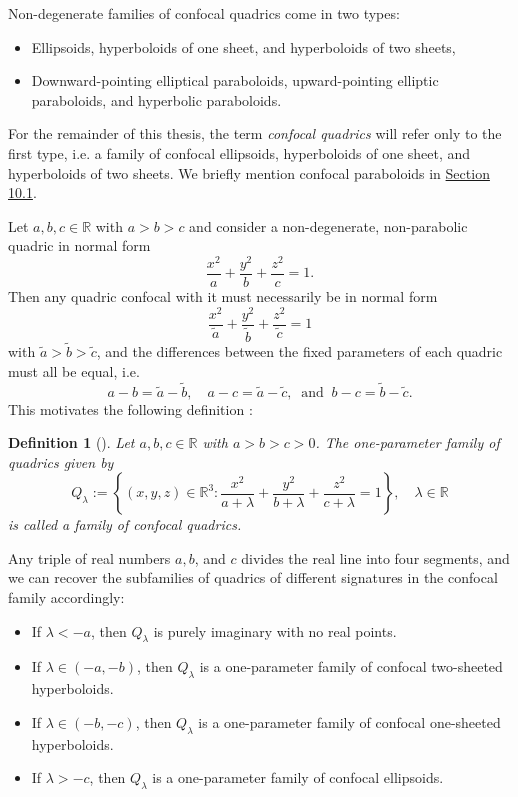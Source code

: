 \documentclass[10pt, a4paper]{article}
\theoremstyle{BoldTopSpacing}
\theoremstyle{BoldTopSpacing}
\theoremstyle{BoldTopSpacing}
\theoremstyle{BoldTopBottomSpacing}
\newtheorem{definition}{Definition}[section]
\theoremstyle{BoldTopSpacing}
\theoremstyle{BoldTopBottomSpacing}
\theoremstyle{remark}
\begin{document}
Non-degenerate families of confocal quadrics come in two types:
\begin{itemize}[label=$\blacktriangleright$]
    \item Ellipsoids, hyperboloids of one sheet, and hyperboloids of two sheets,
    \item Downward-pointing elliptical paraboloids, upward-pointing elliptic paraboloids, and hyperbolic paraboloids.
\end{itemize}
For the remainder of this thesis, the term \textit{confocal quadrics} will refer only to the first type, i.e. a family of confocal ellipsoids, hyperboloids of one sheet, and hyperboloids of two sheets. We briefly mention confocal paraboloids in \hyperref[subsec:confocal-paraboloids]{Section 10.1}. \par

Let $a, b, c \in \mathbb{R}$ with $a > b > c$ and consider a non-degenerate, non-parabolic quadric in normal form
\[
    \frac{x^2}{a} + \frac{y^2}{b} + \frac{z^2}{c} = 1.
\]
Then any quadric confocal with it must necessarily be in normal form
\[
    \frac{x^2}{\tilde{a}} + \frac{y^2}{\tilde{b}} + \frac{z^2}{\tilde{c}} = 1
\]
with $\tilde{a} > \tilde{b} > \tilde{c}$, and the differences between the fixed parameters of each quadric must all be equal, i.e.
\[
    a - b = \tilde{a} - \tilde{b}, \quad a - c = \tilde{a} - \tilde{c}, \ \text{ and } \  b - c = \tilde{b} - \tilde{c}.
\]
This motivates the following definition \cite{geometryIII}:

\begin{definition}[]
\label{def:family-of-confocal-quadrics}
Let $a, b, c \in \mathbb{R}$ with $a > b > c > 0$. The one-parameter family of quadrics given by
\[
    Q_{\lambda} := \left\{ (x, y, z) \in \mathbb{R}^3 : \frac{x^2}{a + \lambda} + \frac{y^2}{b + \lambda} + \frac{z^2}{c + \lambda} = 1 \right\}, \quad \lambda \in \mathbb{R}
\]
is called a family of \textit{confocal quadrics}.
\end{definition}

Any triple of real numbers $a, b$, and $c$ divides the real line into four segments, and we can recover the subfamilies of quadrics of different signatures in the confocal family accordingly:

\begin{itemize}[label=$\blacktriangleright$]
    \item If $\lambda < -a$, then $Q_{\lambda}$ is purely imaginary with no real points.
    \item If $\lambda \in (-a, -b)$, then $Q_{\lambda}$ is a one-parameter family of confocal two-sheeted hyperboloids.
    \item If $\lambda \in (-b, -c)$, then $Q_{\lambda}$ is a one-parameter family of confocal one-sheeted hyperboloids.
    \item If $\lambda > -c$, then $Q_{\lambda}$ is a one-parameter family of confocal ellipsoids. \par
\end{itemize}
\end{document}
